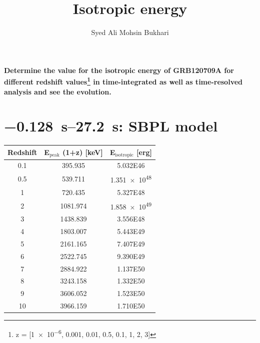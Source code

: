 \documentclass[10pt,report]{article}
\title{Isotropic energy}
\author{Syed Ali Mohsin Bukhari}
\date{}
\begin{document}
	\maketitle
	\noindent\textbf{Determine the value for the isotropic energy of GRB120709A for different redshift values\footnote{z = [\num{1e-6}, 0.001, 0.01, 0.5, 0.1, 1, 2, 3]} in time-integrated as well as time-resolved analysis and see the evolution.}


	\section{\SIrange{-0.128}{27.2}{\second}: SBPL model}
	\begin{minipage}[l]{0.48\textwidth}
		\centering
		\begin{tabular}{ccc}
			\toprule
			Redshift & E$_\text{peak}$ (1+z) [keV]& E$_\text{isotropic}$ [erg] \\
			\midrule
			0.1 & 395.935 & \num{5.032E46}\\
			0.5 & 539.711 & \num{1.351e48}\\
			1 & 720.435 & \num{5.327E48}\\
			2 & 1081.974 & \num{1.858e49}\\
			3 & 1438.839 & \num{3.556E48}\\
			4 & 1803.007 & \num{5.443E49}\\
			5 & 2161.165 & \num{7.407E49}\\
			6 & 2522.745 & \num{9.390E49}\\
			7 & 2884.922 & \num{1.137E50}\\
			8 & 3243.158 & \num{1.332E50}\\
			9 & 3606.052 & \num{1.523E50}\\
			10 & 3966.159 & \num{1.710E50}\\
			\bottomrule
		\end{tabular}
	\end{minipage}
	\hfill
\end{document}
